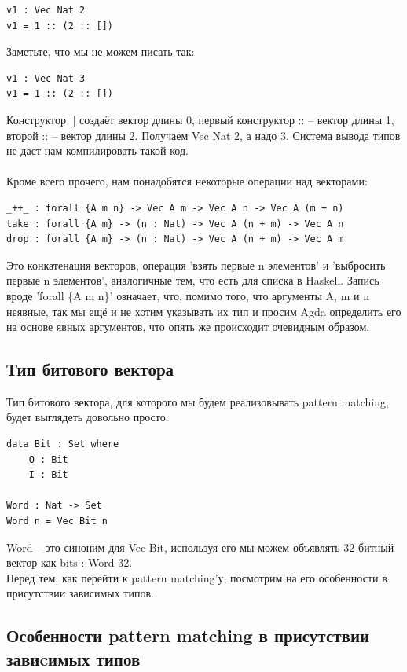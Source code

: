 \documentclass[8pt]{extarticle}
\begin{document}
\begin{lstlisting}
v1 : Vec Nat 2
v1 = 1 :: (2 :: [])
\end{lstlisting}
Заметьте, что мы не можем писать так:
\begin{lstlisting}
v1 : Vec Nat 3
v1 = 1 :: (2 :: [])
\end{lstlisting}
Конструктор [] создаёт вектор длины 0, первый конструктор :: -- вектор длины 1, второй :: -- вектор длины 2. Получаем Vec Nat 2, а надо 3. Система вывода типов не даст нам компилировать такой код.\\
\\
Кроме всего прочего, нам понадобятся некоторые операции над векторами:
\begin{lstlisting}
_++_ : forall {A m n} -> Vec A m -> Vec A n -> Vec A (m + n)
take : forall {A m} -> (n : Nat) -> Vec A (n + m) -> Vec A n
drop : forall {A m} -> (n : Nat) -> Vec A (n + m) -> Vec A m
\end{lstlisting}
Это конкатенация векторов, операция 'взять первые n элементов' и 'выбросить первые n элементов', аналогичные тем, что есть для списка в Haskell. Запись вроде 'forall \{A m n\}' означает, что, помимо того, что аргументы A, m и n неявные, так мы ещё и не хотим указывать их тип и просим Agda определить его на основе явных аргументов, что опять же происходит очевидным образом.


\subsection{Тип битового вектора}

Тип битового вектора, для которого мы будем реализовывать pattern matching, будет выглядеть довольно просто:
\begin{lstlisting}
data Bit : Set where
	O : Bit
	I : Bit

Word : Nat -> Set
Word n = Vec Bit n
\end{lstlisting}
Word -- это синоним для Vec Bit, используя его мы можем объявлять 32-битный вектор как bits : Word 32.\\
Перед тем, как перейти к pattern matching'у, посмотрим на его особенности в присутствии зависимых типов.


\subsection{Особенности pattern matching в присутствии завиcимых типов}
\end{document}
